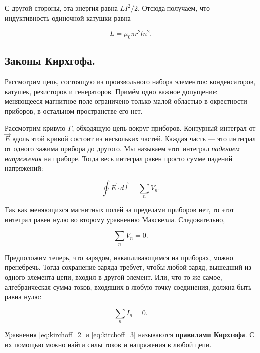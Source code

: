 \documentclass[12pt,a4paper]{article}
\numberwithin{equation}{section}
\numberwithin{equation}{section}
\begin{document}
С другой стороны, эта энергия равна $LI^2/2$. Отсюда получаем, что
индуктивность одиночной катушки равна

\begin{equation}
  \label{eq:inductivity}
  L = \mu_0 \pi r^2 l n^2.
\end{equation}

\subsection{Законы Кирхгофа.}
\label{sec:kirchoff}

Рассмотрим цепь, состоящую из произвольного набора элементов:
конденсаторов, катушек, резисторов и генераторов. Примём одно важное
допущение: меняющееся магнитное поле ограничено только малой областью
в окрестности приборов, в остальном пространстве его нет.

Рассмотрим кривую $\Gamma$, обходящую цепь вокруг приборов. Контурный
интеграл от $\vec{E}$ вдоль этой кривой состоит из нескольких
частей. Каждая часть --- это интеграл от одного зажима прибора до
другого. Мы называем этот интеграл \textit{падением напряжения} на
приборе. Тогда весь интеграл равен просто сумме падений напряжений:

\begin{equation}
  \label{eq:kirchoff_1}
  \oint \vec{E} \cdot d \vec{l} = \sum_n V_n.
\end{equation}

Так как меняющихся магнитных полей за пределами приборов нет, то этот
интеграл равен нулю во второму уравнению Максвелла. Следовательно, 

\begin{equation}
  \label{eq:kirchoff_2}
  \sum_n V_n = 0. 
\end{equation}

Предположим теперь, что зарядом, накапливающимся на приборах, можно
пренебречь. Тогда сохранение заряда требует, чтобы любой заряд,
вышедший из одного элемента цепи, входил в другой элемент. Или, что то
же самое, алгебраическая сумма токов, входящих в любую точку
соединения, должна быть равна нулю:

\begin{equation}
  \label{eq:kirchoff_3}
  \sum_n I_n =0.
\end{equation}

Уравнения \eqref{eq:kirchoff_2} и \eqref{eq:kirchoff_3} называются
\textbf{правилами Кирхгофа}. С их помощью можно найти силы токов и
напряжения в любой цепи. 
\end{document}
